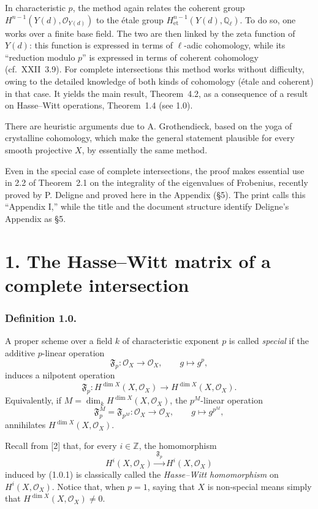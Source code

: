 In characteristic $p$, the method again relates the coherent group
$H^{n-1}(Y(d),\mathcal O_{Y(d)})$ to the étale group
$H^{n-1}_{\mathrm{et}}(Y(d),\mathbb Q_\ell)$.  To do so, one works over a
finite base field.  The two are then linked by the zeta function of $Y(d)$:
this function is expressed in terms of $\ell$-adic cohomology, while its
``reduction modulo $p$'' is expressed in terms of coherent cohomology
(cf.~XXII~3.9).  For complete intersections this method works without
difficulty, owing to the detailed knowledge of both kinds of cohomology
(étale and coherent) in that case.  It yields the main result, Theorem~4.2,
as a consequence of a result on Hasse--Witt operations, Theorem~1.4 (see
1.0).

There are heuristic arguments due to A. Grothendieck, based on the yoga of
crystalline cohomology, which make the general statement plausible for every
smooth projective $X$, by essentially the same method.

Even in the special case of complete intersections, the proof makes
essential use in 2.2 of Theorem~2.1 on the integrality of the eigenvalues of
Frobenius, recently proved by P. Deligne and proved here in the Appendix
(\S 5).  The print calls this ``Appendix I,'' while the title and the document
structure identify Deligne's Appendix as \S 5.

\section*{1. The Hasse--Witt matrix of a complete intersection}

\subsubsection*{Definition 1.0.}
A proper scheme over a field $k$ of characteristic exponent $p$ is called
\emph{special} if the additive $p$-linear operation
\begin{equation}\tag{1.0.1}
\mathfrak F_p:\mathcal O_X\longrightarrow\mathcal O_X,
\qquad g\longmapsto g^p,
\end{equation}
induces a nilpotent operation
\begin{equation}\tag{1.0.2}
\mathfrak F_p:H^{\dim X}(X,\mathcal O_X)
\longrightarrow H^{\dim X}(X,\mathcal O_X).
\end{equation}
Equivalently, if
$M=\dim_k H^{\dim X}(X,\mathcal O_X)$, the $p^M$-linear operation
\begin{equation}\tag{1.0.3}
\mathfrak F_p^M=\mathfrak F_{p^M}:\mathcal O_X\longrightarrow\mathcal O_X,
\qquad g\longmapsto g^{p^M},
\end{equation}
annihilates $H^{\dim X}(X,\mathcal O_X)$.

Recall from \textup{[2]} that, for every $i\in\mathbb Z$, the homomorphism
\begin{equation*}
H^i(X,\mathcal O_X)\xrightarrow{\ \mathfrak F_p\ }H^i(X,\mathcal O_X)
\end{equation*}
induced by (1.0.1) is classically called the \emph{Hasse--Witt
homomorphism} on $H^i(X,\mathcal O_X)$.  Notice that, when $p=1$, saying
that $X$ is non-special means simply that
$H^{\dim X}(X,\mathcal O_X)\ne0$.
